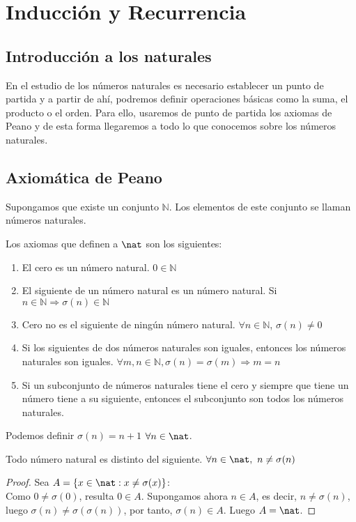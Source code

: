 \section{Inducción y Recurrencia}
\subsection{Introducción a los naturales}
En el estudio de los números naturales es necesario establecer un punto de partida y a partir de ahí, podremos definir operaciones básicas como la suma, el producto o el orden. Para ello, usaremos de punto de partida los axiomas de Peano y de esta forma llegaremos a todo lo que conocemos sobre los números naturales.
\subsection{Axiomática de Peano}
Supongamos que existe un conjunto $\mathbb{N}$. Los elementos de este conjunto se llaman números naturales.
\begin{ndef}
    Los axiomas que definen a $\nat$ son los siguientes:
    \begin{enumerate}[label=\emph{A\arabic*}]
        \item\label{a0} El cero es un número natural. $0 \in \mathbb{N}$
        \item\label{a1} El siguiente de un número natural es un número natural. Si $n \in \mathbb{N} \Rightarrow \sigma(n) \in \mathbb{N}$
        \item\label{a2} Cero no es el siguiente de ningún número natural. $\forall n \in \mathbb{N}$, $\sigma(n) \neq 0$
        \item\label{a3} Si los siguientes de dos números naturales son iguales, entonces los números naturales son iguales. $\forall m,n \in \mathbb{N}, \sigma(n) = \sigma(m) \Rightarrow m = n$
        \item\label{a4} Si un subconjunto de números naturales tiene el cero y siempre que tiene un número tiene a su siguiente, entonces el subconjunto son todos los números naturales.
    \end{enumerate}
\end{ndef}

\begin{nota}
    Podemos definir $\sigma(n) = n + 1$ $\forall n \in \nat$.
\end{nota}

\begin{nth}
    Todo número natural es distinto del siguiente. $\forall n \in \nat,\ n \neq \sigma(n)$
\end{nth}
\begin{proof}
    Sea $A = \{x \in \nat : x \neq \sigma(x)\}$: \\
    Como $0 \neq \sigma(0)$, resulta $0 \in A$.
    Supongamos ahora $n \in A$, es decir, $n \neq \sigma(n)$, luego $\sigma(n) \neq \sigma(\sigma(n))$, por tanto, $\sigma(n) \in A$.
    Luego $A = \nat$.
\end{proof}

